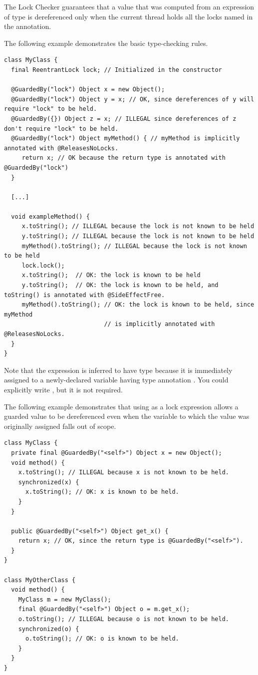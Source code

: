 The Lock Checker guarantees that a value that was computed from an expression of  type is
dereferenced only when the current thread holds all the locks named in the
 annotation.


The following example demonstrates the basic
type-checking rules.

\begin{Verbatim}
class MyClass {
  final ReentrantLock lock; // Initialized in the constructor

  @GuardedBy("lock") Object x = new Object();
  @GuardedBy("lock") Object y = x; // OK, since dereferences of y will require "lock" to be held.
  @GuardedBy({}) Object z = x; // ILLEGAL since dereferences of z don't require "lock" to be held.
  @GuardedBy("lock") Object myMethod() { // myMethod is implicitly annotated with @ReleasesNoLocks.
     return x; // OK because the return type is annotated with @GuardedBy("lock")
  }

  [...]

  void exampleMethod() {
     x.toString(); // ILLEGAL because the lock is not known to be held
     y.toString(); // ILLEGAL because the lock is not known to be held
     myMethod().toString(); // ILLEGAL because the lock is not known to be held
     lock.lock();
     x.toString();  // OK: the lock is known to be held
     y.toString();  // OK: the lock is known to be held, and toString() is annotated with @SideEffectFree.
     myMethod().toString(); // OK: the lock is known to be held, since myMethod
                            // is implicitly annotated with @ReleasesNoLocks.
  }
}
\end{Verbatim}

Note that the expression  is inferred to have type 
because it is immediately assigned to a newly-declared
variable having type annotation .  You could
explicitly write , but it is not
required.

The following example demonstrates that using  as a lock expression
allows a guarded value to be dereferenced even when the variable to which
the value was originally assigned falls out of scope.

\begin{Verbatim}
class MyClass {
  private final @GuardedBy("<self>") Object x = new Object();
  void method() {
    x.toString(); // ILLEGAL because x is not known to be held.
    synchronized(x) {
      x.toString(); // OK: x is known to be held.
    }
  }

  public @GuardedBy("<self>") Object get_x() {
    return x; // OK, since the return type is @GuardedBy("<self>").
  }
}

class MyOtherClass {
  void method() {
    MyClass m = new MyClass();
    final @GuardedBy("<self>") Object o = m.get_x();
    o.toString(); // ILLEGAL because o is not known to be held.
    synchronized(o) {
      o.toString(); // OK: o is known to be held.
    }
  }
}
\end{Verbatim}


